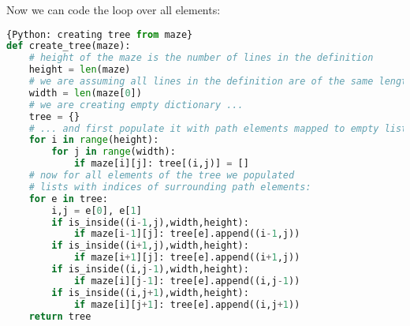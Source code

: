 Now we can code the loop over all elements:
\begin{lstlisting}[language=Python,style=codelst]{Python: creating tree from maze}
def create_tree(maze):
    # height of the maze is the number of lines in the definition
    height = len(maze)
    # we are assuming all lines in the definition are of the same length
    width = len(maze[0])
    # we are creating empty dictionary ...
    tree = {}
    # ... and first populate it with path elements mapped to empty lists
    for i in range(height):
        for j in range(width):
            if maze[i][j]: tree[(i,j)] = []
    # now for all elements of the tree we populated
    # lists with indices of surrounding path elements:
    for e in tree:
        i,j = e[0], e[1]
        if is_inside((i-1,j),width,height): 
            if maze[i-1][j]: tree[e].append((i-1,j))
        if is_inside((i+1,j),width,height): 
            if maze[i+1][j]: tree[e].append((i+1,j))
        if is_inside((i,j-1),width,height): 
            if maze[i][j-1]: tree[e].append((i,j-1))
        if is_inside((i,j+1),width,height): 
            if maze[i][j+1]: tree[e].append((i,j+1))
    return tree

\end{lstlisting}















